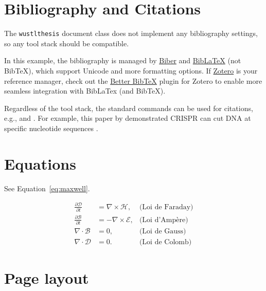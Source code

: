 \section{Bibliography and Citations}
The \texttt{wustlthesis} document class does not implement any bibliography settings, so any tool stack should be compatible.

In this example, the bibliography is managed by \href{http://biblatex-biber.sourceforge.net/}{Biber} and \href{https://www.ctan.org/pkg/biblatex}{BibLaTeX} (not BibTeX), which support Unicode and more formatting options.
If \href{https://www.zotero.org/}{Zotero} is your reference manager, check out the \href{https://retorque.re/zotero-better-bibtex/}{Better BibTeX} plugin for Zotero to enable more seamless integration with BibLaTex (and BibTeX).

Regardless of the tool stack, the standard commands can be used for citations, e.g., \cmd{\cite} and \cmd{\citeauthor}.
For example, this paper by \citeauthor{Jinek2012} demonstrated CRISPR can cut DNA at specific nucleotide sequences \cite{Jinek2012}.


\section{Equations}
See Equation~\ref{eq:maxwell}.

\begin{equation}
    \label{eq:maxwell}
    \begin{aligned}
    \frac{\partial\mathcal{D}}{\partial t} & = \nabla\times\mathcal{H},   & \text{(Loi de Faraday)}\\
    \frac{\partial\mathcal{B}}{\partial t} & = -\nabla\times\mathcal{E},  & \text{(Loi d'Ampère)}\\
    \nabla\cdot\mathcal{B}                 & = 0,                         & \text{(Loi de Gauss)}\\
    \nabla\cdot\mathcal{D}                 & = 0.                         & \text{(Loi de Colomb)}
    \end{aligned}
\end{equation}

\clearpage
\section{Page layout}
\layout
